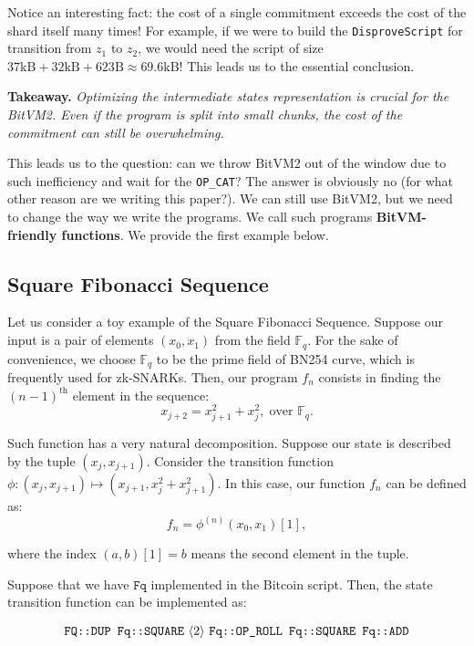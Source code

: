 \documentclass{iacrtrans}
\newcommand{\elem}[1]{\, \langle #1 \rangle \,}
\newcommand{\opcode}[1]{\, \texttt{#1} \,}
\begin{document}
Notice an interesting fact: the cost of a single commitment exceeds the cost of
the shard itself many times! For example, if we were to build the
\texttt{DisproveScript} for transition from $z_1$ to $z_2$, we would need the
script of size $37\text{kB}+32\text{kB}+623\text{B} \approx 69.6\text{kB}$! This
leads us to the essential conclusion.

\textbf{Takeaway.} \textit{Optimizing the intermediate states representation is crucial for the BitVM2. Even if the program is split into small chunks, the cost of the commitment can still be overwhelming.}

This leads us to the question: can we throw BitVM2 out of the window due to such
inefficiency and wait for the \texttt{OP\_CAT}? The answer is obviously no (for
what other reason are we writing this paper?). We can still use BitVM2, but we
need to change the way we write the programs. We call such programs
\textbf{BitVM-friendly functions}. We provide the first example below.

\subsection{Square Fibonacci Sequence}
Let us consider a toy example of the Square Fibonacci Sequence. Suppose our
input is a pair of elements $(x_0,x_1)$ from the field $\mathbb{F}_q$. For the
sake of convenience, we choose $\mathbb{F}_q$ to be the prime field of BN254
curve, which is frequently used for zk-SNARKs. Then, our program $f_n$ consists
in finding the $(n-1)^{\text{th}}$ element in the sequence:
\begin{equation*}
  x_{j+2} = x_{j+1}^2 + x_j^2, \; \text{over $\mathbb{F}_q$.}
\end{equation*}

Such function has a very natural decomposition. Suppose our state is described
by the tuple $(x_j,x_{j+1})$. Consider the transition function $\phi: (x_j,
x_{j+1}) \mapsto (x_{j+1}, x_j^2 + x_{j+1}^2)$. In this case, our function $f_n$
can be defined as:
\begin{equation*}
  f_n = \phi^{(n)}(x_0,x_1)[1],
\end{equation*}

where the index $(a, b)[1] = b$ means the second element in the tuple.

Suppose that we have $\mathtt{Fq}$ implemented in the Bitcoin script. Then, the
state transition function can be implemented as:
\begin{empheqboxed}
  \begin{align*}
    \opcode{\texttt{FQ::DUP}} \, \opcode{\texttt{Fq::SQUARE}} \elem{2} \opcode{\texttt{Fq::OP\_ROLL}} \, \opcode{\texttt{Fq::SQUARE}} \, \opcode{\texttt{Fq::ADD}}
  \end{align*}
\end{empheqboxed}
\end{document}
